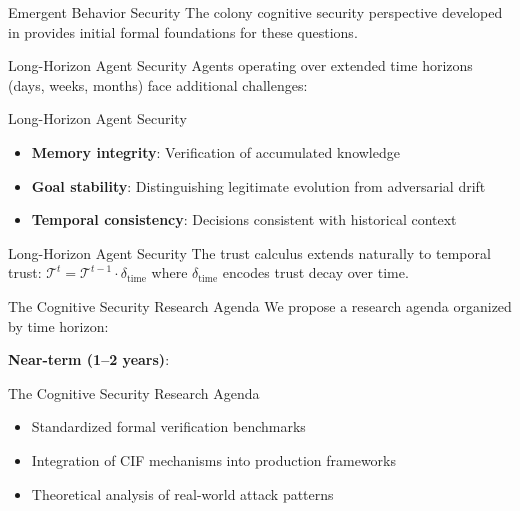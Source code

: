 \documentclass[
  ignorenonframetext,
]{beamer}
\providecommand{\cref}[1]{\texttt{\detokenize{#1}}}
\begin{document}
\begin{frame}[allowframebreaks]{Emergent Behavior Security}
The colony cognitive security perspective developed in
\cref{sec:eusocial-cogsec} provides initial formal foundations for these
questions.
\end{frame}

\begin{frame}[allowframebreaks]{Long-Horizon Agent Security}
\protect{}\label{long-horizon-agent-security}
Agents operating over extended time horizons (days, weeks, months) face
additional challenges:

\end{frame}

\begin{frame}[allowframebreaks]{Long-Horizon Agent Security}
\begin{itemize}
\item \textbf{Memory integrity}: Verification of accumulated knowledge
\item \textbf{Goal stability}: Distinguishing legitimate evolution from adversarial drift
\item \textbf{Temporal consistency}: Decisions consistent with historical context
\end{itemize}

\end{frame}

\begin{frame}[allowframebreaks]{Long-Horizon Agent Security}
The trust calculus extends naturally to temporal trust:
\(\mathcal{T}^{t} = \mathcal{T}^{t-1} \cdot \delta_{\text{time}}\) where
\(\delta_{\text{time}}\) encodes trust decay over time.
\end{frame}

\begin{frame}[allowframebreaks]{The Cognitive Security Research Agenda}
\protect{}\label{the-cognitive-security-research-agenda}
We propose a research agenda organized by time horizon:

\textbf{Near-term (1--2 years)}:

\end{frame}

\begin{frame}[allowframebreaks]{The Cognitive Security Research Agenda}
\begin{itemize}
\item Standardized formal verification benchmarks
\item Integration of CIF mechanisms into production frameworks
\item Theoretical analysis of real-world attack patterns
\end{itemize}

\end{frame}
\end{document}
